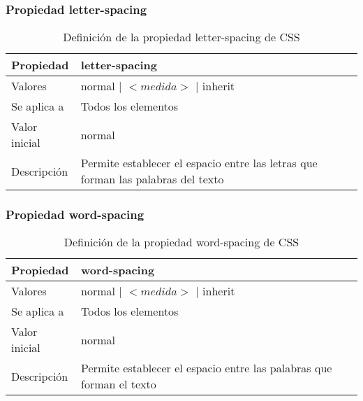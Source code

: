 \begin{frame}
\frametitle{Propiedad letter-spacing}

\begin{center}
  \begin{table}
   \begin{tabular}{p{1.8cm}p{7.8cm}}
Propiedad & \bf{letter-spacing} \\ \hline
Valores& normal | $<medida>$ | inherit \\ \hline
Se aplica a& Todos los elementos \\ \hline
Valor inicial& normal \\ \hline
Descripción& Permite establecer el espacio entre las letras que forman las palabras del texto \\ \hline
  \end{tabular}
   \caption{Definición de la propiedad letter-spacing de CSS}
 \end{table}
\end{center}


\end{frame}



\begin{frame}
\frametitle{Propiedad word-spacing}

\begin{center}
  \begin{table}
   \begin{tabular}{p{1.8cm}p{7.8cm}}
Propiedad & \bf{word-spacing} \\ \hline
Valores& normal | $<medida>$ | inherit \\ \hline
Se aplica a& Todos los elementos \\ \hline
Valor inicial& normal \\ \hline
Descripción& Permite establecer el espacio entre las palabras que forman el texto \\ \hline
  \end{tabular}
   \caption{Definición de la propiedad word-spacing de CSS}
 \end{table}
\end{center}


\end{frame}




